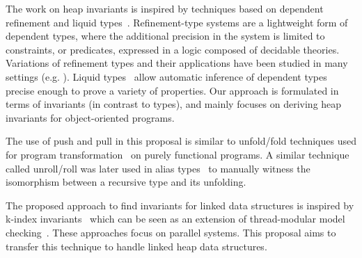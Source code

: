 The work on heap invariants is inspired by techniques based on dependent
refinement and liquid types~\cite{RondonKJ08}.  Refinement-type
  systems are a lightweight form of dependent types, where the
additional precision in the system is limited to constraints, or
predicates, expressed in a logic composed of decidable theories.
Variations of refinement types and their applications have been
studied in many settings
(e.g. \cite{FreemanP91,XiP99,KnowlesF10,BengtsonBFGM08}).  
%
Liquid types~\cite{RondonKJ08} allow automatic inference of dependent
types precise enough to prove a variety of properties.  Our approach
is formulated in terms of invariants (in contrast to types), and
mainly focuses on deriving heap invariants for
object-oriented programs.
  
The use of push and pull in this proposal is similar to  unfold/fold
techniques used for program transformation~\cite{BurstallD77} on purely
functional programs.
A similar technique called unroll/roll was later used in alias
types~\cite{WalkerM00} to manually witness the isomorphism between a recursive
type and its unfolding.

The proposed approach to find invariants for linked data structures is 
inspired by k-index invariants~\cite{Sanchez:2012:IGP:2414936.2414950} which can be seen as an extension of thread-modular model 
checking~\cite{Flanagan:2003:TMC:1767111.1767125}. These approaches focus
on parallel systems. This proposal aims to transfer this technique to handle
linked heap data structures.


